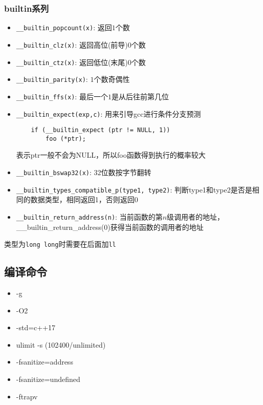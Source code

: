 \documentclass{ctexart}
\begin{document}
\subsubsection{builtin系列}
\begin{itemize}
    \item \texttt{\_\_builtin\_popcount(x)}: 返回$1$个数
    \item \texttt{\_\_builtin\_clz(x)}: 返回高位(前导)$0$个数
    \item \texttt{\_\_builtin\_ctz(x)}: 返回低位(末尾)$0$个数
    \item \texttt{\_\_builtin\_parity(x)}: $1$个数奇偶性
    \item \texttt{\_\_builtin\_ffs(x)}: 最后一个$1$是从后往前第几位
    \item \texttt{\_\_builtin\_expect(exp,c)}: 用来引导gcc进行条件分支预测
    
\begin{lstlisting}
    if (__builtin_expect (ptr != NULL, 1))
        foo (*ptr);
\end{lstlisting}
表示ptr一般不会为NULL，所以foo函数得到执行的概率较大
    
    \item \texttt{\_\_builtin\_bswap32(x)}: $32$位数按字节翻转
    \item \texttt{\_\_builtin\_types\_compatible\_p(type1, type2)}: 判断type1和type2是否是相同的数据类型，相同返回1，否则返回0
    \item \texttt{\_\_builtin\_return\_address(n)}: 当前函数的第$n$级调用者的地址，\_\_builtin\_return\_address(0)获得当前函数的调用者的地址
\end{itemize}
类型为\texttt{long long}时需要在后面加\texttt{ll} 
\subsection{编译命令}
\begin{itemize}
    \item -g
    \item -O2
    \item -std=c++17
    \item ulimit -s (102400/unlimited)
    \item -fsanitize=address
    \item -fsanitize=undefined
    \item -ftrapv
\end{itemize}
\end{document}
